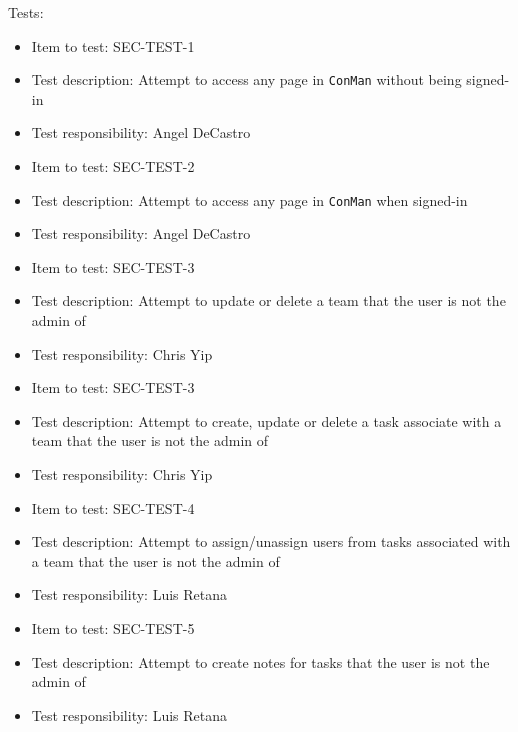 \documentclass{article}
\begin{document}
Tests:
\begin{itemize}
\item Item to test: SEC-TEST-1
\item Test description: Attempt to access any page in \texttt{ConMan} without 
being signed-in
\item Test responsibility: Angel DeCastro
\end{itemize}
\begin{itemize}
\item Item to test: SEC-TEST-2
\item Test description: Attempt to access any page in \texttt{ConMan} when 
signed-in
\item Test responsibility: Angel DeCastro
\end{itemize}
\begin{itemize}
\item Item to test: SEC-TEST-3
\item Test description: Attempt to update or delete a team that the user is 
not the admin of
\item Test responsibility: Chris Yip
\end{itemize}
\begin{itemize}
\item Item to test: SEC-TEST-3
\item Test description: Attempt to create, update or delete a task associate with 
a team that the user is not the admin of
\item Test responsibility: Chris Yip
\end{itemize}
\begin{itemize}
\item Item to test: SEC-TEST-4
\item Test description: Attempt to assign/unassign users from tasks associated 
with a team that the user is not the admin of
\item Test responsibility: Luis Retana
\end{itemize}
\begin{itemize}
\item Item to test: SEC-TEST-5
\item Test description: Attempt to create notes for tasks that the user 
is not the admin of
\item Test responsibility: Luis Retana
\end{itemize}
\end{document}
